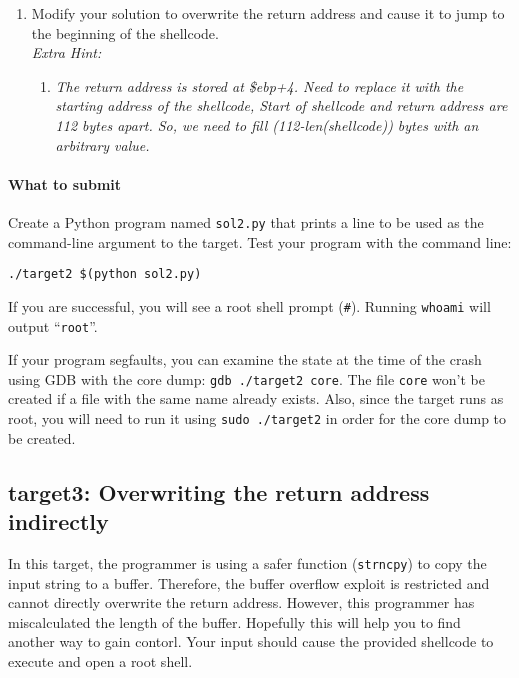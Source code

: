 \documentclass[letterpaper,12pt]{report}
\begin{document}
{\begin{enumerate}
  How does it work?
\item Modify your solution to overwrite the return address and cause it to jump to the beginning of the shellcode. \\
\textit{Extra Hint:}
\vspace{-11pt}
\begin{enumerate}
\item \textit{The return address is stored at \$ebp+4. Need to replace it with the starting address of the shellcode, Start of shellcode and return address are 112 bytes apart. So, we need to fill (112-len(shellcode)) bytes with an arbitrary value.}
\end{enumerate}
\end{enumerate}

\paragraph{What to submit}
Create a Python program named \texttt{sol2.py} that prints a line to be used as the command-line argument to the target.  Test your program with the command line:

\smallskip

\quad\texttt{./target2 \$(python sol2.py)}

\medskip

If you are successful, you will see a root shell prompt (\texttt{\#}).  Running \texttt{whoami} will output ``\texttt{root}''.

\medskip

If your program segfaults, you can examine the state at the time of the crash using GDB with the core dump: \texttt{gdb ./target2 core}.  The file \texttt{core} won't be created if a file with the same name already exists.  Also, since the target runs as root, you will need to run it using \texttt{sudo ./target2} in order for the core dump to be created.

\subsection*{target3: Overwriting the return address indirectly }
\label{sec:target3}

In this target, the programmer is using a safer function (\texttt{strncpy}) to copy the input string to a buffer. Therefore, the buffer overflow exploit is restricted and cannot directly overwrite the return address.   However, this programmer has miscalculated the length of the buffer. Hopefully this will help you to find another way to gain contorl.  Your input should cause the provided shellcode to execute and open a root shell.
\\
\smallskip

}
\end{document}
